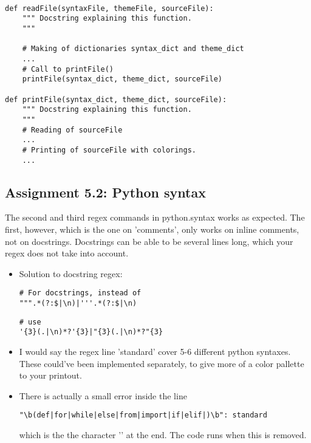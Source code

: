 \documentclass[a4paper]{article}
\begin{document}
\begin{itemize}
\begin{itemize}
 \begin{verbatim}

def readFile(syntaxFile, themeFile, sourceFile):
    """ Docstring explaining this function.
    """
    
    # Making of dictionaries syntax_dict and theme_dict
    ...
    # Call to printFile()
    printFile(syntax_dict, theme_dict, sourceFile)
    
def printFile(syntax_dict, theme_dict, sourceFile):
	""" Docstring explaining this function.
    """
    # Reading of sourceFile
    ...
    # Printing of sourceFile with colorings.
    ...
    \end{verbatim}    
    
	\end{itemize}
\end{itemize}

\subsection*{Assignment 5.2: Python syntax} \label{sec:assignment5.2}
The second and third regex commands in python.syntax works as expected. The first, however, 
which is the one on 'comments', only works on inline comments, not on docstrings. Docstrings can be able to be several lines long, which your regex does not take into account.
\begin{itemize}

\item Solution to docstring regex:
\newline
\begin{verbatim}
# For docstrings, instead of 
""".*(?:$|\n)|'''.*(?:$|\n)
\end{verbatim}
\begin{verbatim}
# use
'{3}(.|\n)*?'{3}|"{3}(.|\n)*?"{3}
\end{verbatim}
\item I would say the regex line 'standard' cover 5-6 different python syntaxes. These could've been implemented separately, to give more of a color pallette to your printout.
\item There is actually a small error inside the line

\begin{verbatim}
"\b(def|for|while|else|from|import|if|elif|)\b": standard
\end{verbatim}
\newline
which is the the character '\textbar' at the end. The code runs when this is removed.

\end{itemize}
\end{document}
